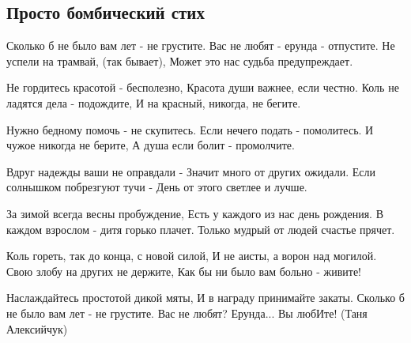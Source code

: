  
 
 

\subsection{Просто бомбический стих}


\begin{multicols}{2}
	\obeycr
Сколько б не было вам лет - не грустите.
Вас не любят - ерунда - отпустите.
Не успели на трамвай, (так бывает),
Может это нас судьба предупреждает.

Не гордитесь красотой - бесполезно,
Красота души важнее, если честно.
Коль не ладятся дела - подождите,
И на красный, никогда, не бегите.

Нужно бедному помочь - не скупитесь. 
Если нечего подать - помолитесь.
И чужое никогда не берите,
А душа если болит - промолчите.

Вдруг надежды ваши не оправдали -
Значит много от других ожидали.
Если солнышком побрезгуют тучи -
День от этого светлее и лучше.

За зимой всегда весны пробуждение,
Есть у каждого из нас день рождения.
В каждом взрослом - дитя горько плачет.
Только  мудрый от людей счастье прячет.

Коль гореть, так до конца, с новой силой,
И не аисты, а ворон над могилой.
Свою злобу на других не держите,
Как бы ни было вам больно - живите!

Наслаждайтесь простотой дикой мяты,
И в награду принимайте закаты.
Сколько б не было вам лет - не грустите.
Вас не любят? Ерунда... Вы любИте!
(Таня Алексийчук)
	\restorecr
\end{multicols}
